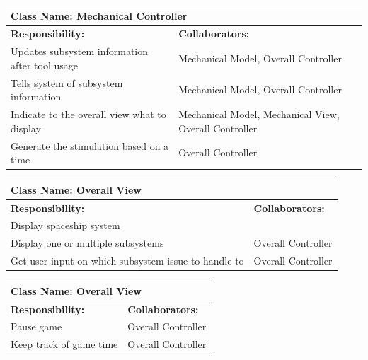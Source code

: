 \documentclass[12pt, titlepage]{article}
\begin{document}
\begin{enumerate}[a)]
	\begin{table}[H]
		\centering
		\begin{tabular}{|p{5cm}|p{5cm}|}
		\hline 
		 \multicolumn{2}{|l|}{\textbf{Class Name: Mechanical Controller}} \\
		\hline
		\textbf{Responsibility:} & \textbf{Collaborators:} \\
		\hline
		Updates subsystem information after tool usage & Mechanical Model, Overall Controller\\
		\hline
		 Tells system of subsystem information & Mechanical Model, Overall Controller\\
		\hline
		 Indicate to the overall view what to display & Mechanical Model, Mechanical View, Overall Controller\\
		\hline
		 Generate the stimulation based on a time & Overall Controller \\
		\hline
		\end{tabular}
	\end{table}

	\begin{table}[H]
		\centering
		\begin{tabular}{|p{5cm}|p{5cm}|}
		\hline 
		 \multicolumn{2}{|l|}{\textbf{Class Name: Overall View}} \\
		\hline
		\textbf{Responsibility:} & \textbf{Collaborators:} \\
		\hline
		 Display spaceship system & \\
		\hline
		Display one or multiple subsystems & Overall Controller\\
		\hline
		Get user input on which subsystem issue to handle to & Overall Controller \\
		\hline
		\end{tabular}
	\end{table}

	\begin{table}[H]
		\centering
		\begin{tabular}{|p{5cm}|p{5cm}|}
		\hline 
		 \multicolumn{2}{|l|}{\textbf{Class Name: Overall View}} \\
		\hline
		\textbf{Responsibility:} & \textbf{Collaborators:} \\
		\hline
		 Pause game & Overall Controller \\
		\hline
		 Keep track of game time & Overall Controller\\
		\hline
		\end{tabular}
	\end{table}


\end{enumerate}
\end{document}
